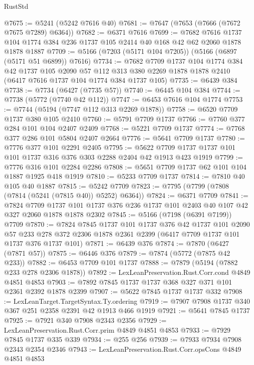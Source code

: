 \begin{lexlean}{RustStd}
\begin{coremodule}
@7675 := @5241 (@5242 @7616 @40)
@7681 := @7647 (@7653 (@7666 (@7672 @7675 @7289) @6364))
@7682 := @6371 @7616
@7699 := @7682
    @7616
    @1737
    @104
    @1774
    @384
    @236
    @1737
    @105
    @2414
    @40
    @168
    @42
    @62
    @2060
    @1878
    @1878
    @1887
@7709 := @5166 (@7203 (@5171 @104 @7205)) (@5166 (@6897 (@5171 @51 @6899)) @7616)
@7734 := @7682
    @7709
    @1737
    @104
    @1774
    @384
    @42
    @1737
    @105
    @2090
    @57
    @112
    @313
    @380
    @2269
    @1878
    @1878
    @2410
    (@6417 @7616 @1737 @104 @1774 @384 @1737 @105)
@7735 := @6439 @384
@7738 := @7734 (@6427 (@7735 @57))
@7740 := @6445 @104 @384
@7744 := @7738 (@5772 (@7740 @42 @112))
@7747 := @6453 @7616 @104 @1774
@7753 := @7744 (@5194 (@7747 @112 @313 @2269 @1878))
@7758 := @6520 @7709 @1737 @380 @105 @2410
@7760 := @5791 @7709 @1737
@7766 := @7760 @377 @284 @101 @104 @2407 @2409
@7768 := @5221 @7709 @1737
@7774 := @7768 @377 @286 @101 @5804 @2407 @2664
@7776 := @5641 @7709 @1737
@7780 := @7776 @377 @101 @2291 @2405
@7795 := @5622 @7709 @1737 @1737 @101 @101 @1737 @316 @376 @303 @2288 @2404 @42 @1913 @423 @1919
@7799 := @7776 @316 @101 @2284 @2286
@7808 := @5651 @7709 @1737 @62 @101 @104 @1887 @1925 @418 @1919
@7810 := @5233 @7709 @1737
@7814 := @7810 @40 @105 @40 @1887
@7815 := @5242 @7709
@7823 := @7795 (@7799 (@7808 (@7814 (@5241 (@7815 @40)) @5252) @6364))
@7824 := @6371 @7709
@7841 := @7824
    @7709
    @1737
    @101
    @1737
    @376
    @236
    @1737
    @101
    @2403
    @40
    @107
    @42
    @327
    @2060
    @1878
    @1878
    @2302
@7845 := @5166 (@7198 (@6391 @7199)) @7709
@7870 := @7824
    @7845
    @1737
    @101
    @1737
    @376
    @42
    @1737
    @101
    @2090
    @57
    @233
    @278
    @372
    @2306
    @1878
    @2361
    @2399
    (@6417 @7709 @1737 @101 @1737 @376 @1737 @101)
@7871 := @6439 @376
@7874 := @7870 (@6427 (@7871 @57))
@7875 := @6446 @376
@7879 := @7874 (@5772 (@7875 @42 @233))
@7882 := @6453 @7709 @101 @1737
@7888 := @7879 (@5194 (@7882 @233 @278 @2306 @1878))
@7892 := LexLeanPreservation.Rust.Corr.cond @4849 @4851 @4853
@7903 := @7892 @7845 @1737 @1737 @368 @327 @371 @101 @2361 @2392 @1878 @2399
@7907 := @5622 @7845 @1737 @1737 @332
@7908 := LexLeanTarget.TargetSyntax.Ty.ordering
@7919 := @7907 @7908 @1737 @340 @367 @251 @2358 @2391 @42 @1913 @466 @1919
@7921 := @5641 @7845 @1737
@7925 := @7921 @340 @7908 @2343 @2356
@7929 := LexLeanPreservation.Rust.Corr.prim @4849 @4851 @4853
@7933 := @7929 @7845 @1737 @335 @339
@7934 := @255 @256
@7939 := @7933 @7934 @7908 @2343 @2354 @2346
@7943 := LexLeanPreservation.Rust.Corr.opsCons @4849 @4851 @4853

\end{coremodule}
\end{lexlean}
